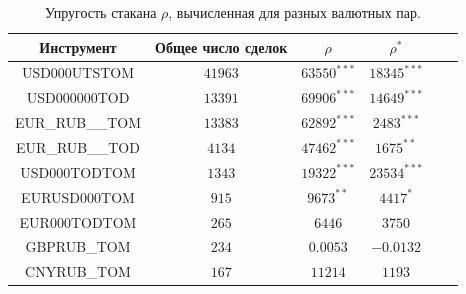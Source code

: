 \begin{table}[h!]
    \begin{center}
        \begin{tabular}{|c|c|c|c|c|c|}
            \hline
        Инструмент        & Общее число сделок & $\rho$ & $\rho ^*$ \\ \hline
        USD000UTSTOM    & $41963$ & $63550^{***}$ & $18345^{***}$ \\ \hline
        USD000000TOD    & $13391$ & $69906^{***}$ & $14649^{***}$ \\ \hline
        EUR\_RUB\_\_TOM & $13383$ & $62892^{***}$ & $2483^{***} $ \\ \hline
        EUR\_RUB\_\_TOD & $4134 $ & $47462^{***}$ & $1675^{**}  $ \\ \hline
        USD000TODTOM    & $1343 $ & $19322^{***}$ & $23534^{***}$ \\ \hline
        EURUSD000TOM    & $915  $ & $9673^{**}  $ & $4417^{*}   $ \\ \hline
        EUR000TODTOM    & $265  $ & $6446       $ & $3750       $ \\ \hline
        GBPRUB\_TOM     & $234  $ & $0.0053     $ & $-0.0132    $ \\ \hline
        CNYRUB\_TOM     & $167  $ & $11214      $ & $1193       $ \\ \hline
        \end{tabular}
    \end{center}
    \label{tableanal}
    \caption{Упругость стакана $\rho$, вычисленная для разных валютных пар.}
\end{table} 

